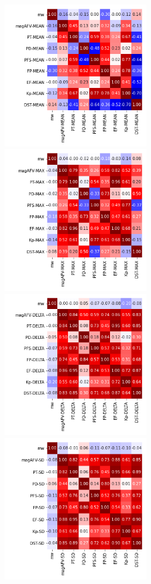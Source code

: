 \documentclass[12pt]{article}
\begin{document}
\newpage

\begin{figure}
   \includegraphics[width=0.57\textwidth]{eight-nine_mean_1.png}
   \includegraphics[width=0.57\textwidth]{eight-nine_max_1.png}
   \includegraphics[width=0.57\textwidth]{eight-nine_delta_1.png}
   \includegraphics[width=0.57\textwidth]{eight-nine_sd_1.png}
\end{figure}
\end{document}
